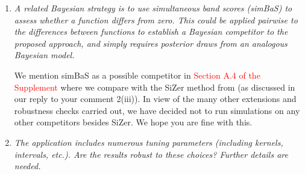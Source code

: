 \documentclass[a4paper,12pt]{article}
\begin{document}
\begin{enumerate}[label=\arabic*.,leftmargin=0.6cm]
    
\item \textit{A related Bayesian strategy is to use simultaneous band scores (simBaS) to assess whether a function differs from zero. This could be applied pairwise to the differences between functions to establish a Bayesian competitor to the proposed approach, and simply requires posterior draws from an analogous Bayesian model.}

We mention simBaS as a possible competitor in \textcolor{red}{Section A.4 of the Supplement} where we compare with the SiZer method from \cite{Park2009} (as discussed in our reply to your comment 2(iii)). In view of the many other extensions and robustness checks carried out, we have decided not to run simulations on any other competitors besides SiZer. We hope you are fine with this. 

  
\item \textit{The application includes numerous tuning parameters (including kernels, intervals, etc.). Are the results robust to these choices? Further details are needed.}
  

\end{enumerate}
\end{document}
